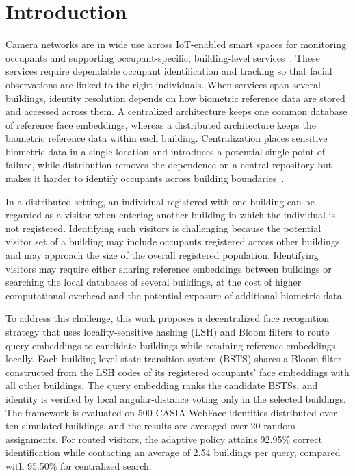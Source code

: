 \documentclass[pdflatex,sn-mathphys-num]{sn-jnl}%
\theoremstyle{thmstyleone}%
\theoremstyle{thmstyletwo}%
\theoremstyle{thmstylethree}%
\begin{document}
\maketitle


\section{Introduction}

Camera networks are in wide use across IoT-enabled smart spaces for monitoring occupants and supporting occupant-specific, building-level services~\cite{SM2022, hou2017}. These services require dependable occupant identification and tracking so that facial observations are linked to the right individuals. When services span several buildings, identity resolution depends on how biometric reference data are stored and accessed across them. A centralized architecture keeps one common database of reference face embeddings, whereas a distributed architecture keeps the biometric reference data within each building. Centralization places sensitive biometric data in a single location and introduces a potential single point of failure, while distribution removes the dependence on a central repository but makes it harder to identify occupants across building boundaries~\cite{mohan2020}.

In a distributed setting, an individual registered with one building can be regarded as a visitor when entering another building in which the individual is not registered. Identifying such visitors is challenging because the potential visitor set of a building may include occupants registered across other buildings and may approach the size of the overall registered population. Identifying visitors may require either sharing reference embeddings between buildings or searching the local databases of several buildings, at the cost of higher computational overhead and the potential exposure of additional biometric data.

To address this challenge, this work proposes a decentralized face recognition strategy that uses locality-sensitive hashing (LSH) and Bloom filters to route query embeddings to candidate buildings while retaining reference embeddings locally. Each building-level state transition system (BSTS) shares a Bloom filter constructed from the LSH codes of its registered occupants' face embeddings with all other buildings. The query embedding ranks the candidate BSTSs, and identity is verified by local angular-distance voting only in the selected buildings. The framework is evaluated on 500 CASIA-WebFace identities distributed over ten simulated buildings, and the results are averaged over 20 random assignments. For routed visitors, the adaptive policy attains 92.95\% correct identification while contacting an average of 2.54 buildings per query, compared with 95.50\% for centralized search.
\end{document}
